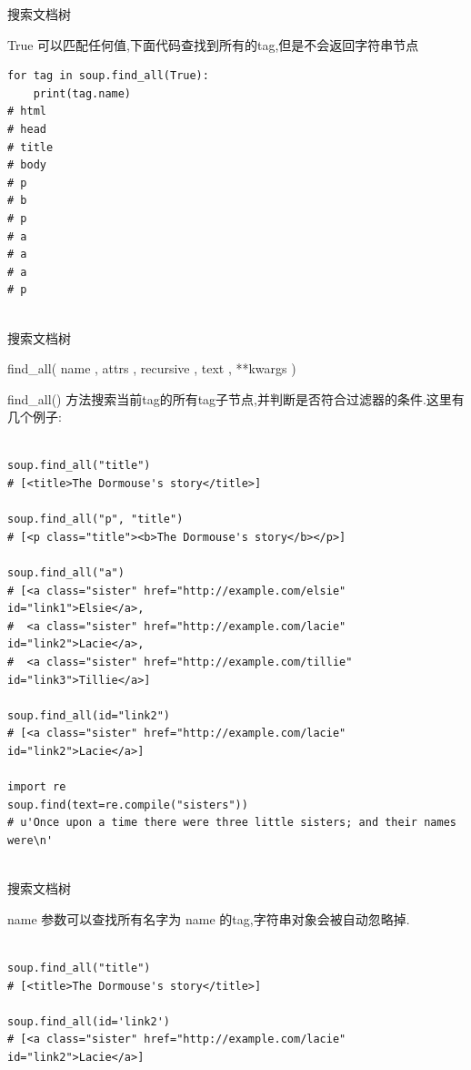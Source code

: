 \documentclass{beamer}
\begin{document}
\begin{frame}[t,fragile]{搜索文档树}

True 可以匹配任何值,下面代码查找到所有的tag,但是不会返回字符串节点

\begin{verbatim}
for tag in soup.find_all(True):
    print(tag.name)
# html
# head
# title
# body
# p
# b
# p
# a
# a
# a
# p


\end{verbatim}
\end{frame}

\begin{frame}[t,fragile]{搜索文档树}

find\_all( name , attrs , recursive , text , **kwargs )

find\_all() 方法搜索当前tag的所有tag子节点,并判断是否符合过滤器的条件.这里有几个例子:

\tiny
\begin{verbatim}

soup.find_all("title")
# [<title>The Dormouse's story</title>]

soup.find_all("p", "title")
# [<p class="title"><b>The Dormouse's story</b></p>]

soup.find_all("a")
# [<a class="sister" href="http://example.com/elsie" id="link1">Elsie</a>,
#  <a class="sister" href="http://example.com/lacie" id="link2">Lacie</a>,
#  <a class="sister" href="http://example.com/tillie" id="link3">Tillie</a>]

soup.find_all(id="link2")
# [<a class="sister" href="http://example.com/lacie" id="link2">Lacie</a>]

import re
soup.find(text=re.compile("sisters"))
# u'Once upon a time there were three little sisters; and their names were\n'


\end{verbatim}


\end{frame}



\begin{frame}[t,fragile]{搜索文档树}

name 参数可以查找所有名字为 name 的tag,字符串对象会被自动忽略掉.

\begin{verbatim}

soup.find_all("title")
# [<title>The Dormouse's story</title>]

soup.find_all(id='link2')
# [<a class="sister" href="http://example.com/lacie" id="link2">Lacie</a>]



\end{verbatim}
\end{frame}
\end{document}

